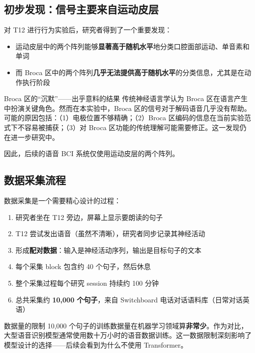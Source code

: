 \documentclass[a4paper]{article}
\begin{document}
\subsection{初步发现：信号主要来自运动皮层}

对 T12 进行行为实验后，研究者得到了一个重要发现：

\begin{itemize}
    \item 运动皮层中的两个阵列能够\textbf{显著高于随机水平}地分类口腔面部运动、单音素和单词
    \item 而 Broca 区中的两个阵列\textbf{几乎无法提供高于随机水平}的分类信息，尤其是在动作执行阶段
\end{itemize}

\begin{warningbox}{Broca 区的``沉默''——出乎意料的结果}
传统神经语言学认为 Broca 区在语言产生中扮演关键角色。然而在本实验中，Broca 区的信号对于解码语音几乎没有帮助。可能的原因包括：（1）电极位置不够精确；（2）Broca 区编码的信息在当前实验范式下不容易被捕获；（3）对 Broca 区功能的传统理解可能需要修正。这一发现仍在进一步研究中。
\end{warningbox}

因此，后续的语音 BCI 系统仅使用运动皮层的两个阵列。

\subsection{数据采集流程}

数据采集是一个需要精心设计的过程：

\begin{enumerate}
    \item 研究者坐在 T12 旁边，屏幕上显示要朗读的句子
    \item T12 尝试发出语音（虽然不清晰），研究者同步记录其神经活动
    \item 形成\textbf{配对数据}：输入是神经活动序列，输出是目标句子的文本
    \item 每个采集 block 包含约 40 个句子，然后休息
    \item 整个采集过程每个研究 session 持续约 100 分钟
    \item 总共采集约 \textbf{10,000 个句子}，来自 Switchboard 电话对话语料库（日常对话英语）
\end{enumerate}

\begin{importantbox}{数据量的限制}
10,000 个句子的训练数据量在机器学习领域算\textbf{非常少}。作为对比，大型语音识别模型通常使用数十万小时的语音数据训练。这一数据限制深刻影响了模型设计的选择——后续会看到为什么不使用 Transformer。
\end{importantbox}
\end{document}
